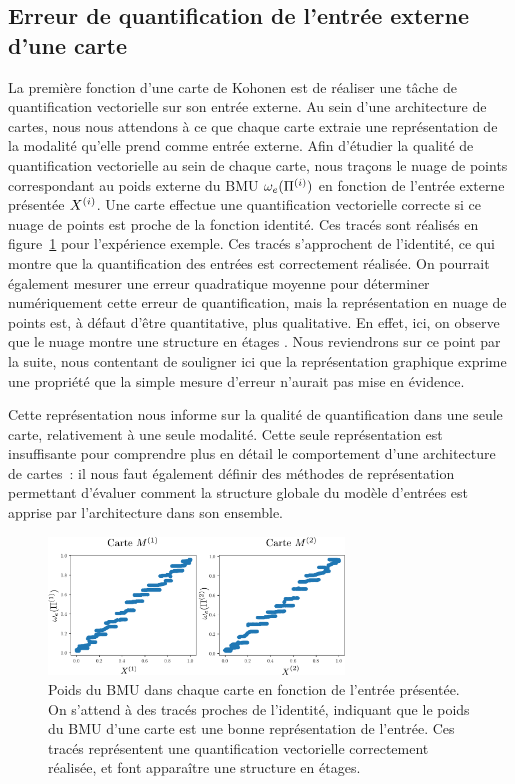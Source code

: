 \documentclass[../main]{subfiles}
\begin{document}
\subsection{Erreur de quantification de l'entrée externe d'une carte}

La première fonction d'une carte de Kohonen est de réaliser une tâche de quantification vectorielle sur son entrée externe. 
Au sein d'une architecture de cartes, nous nous attendons à ce que chaque carte extraie une représentation de la modalité qu'elle prend comme entrée externe.
Afin d'étudier la qualité de quantification vectorielle au sein de chaque carte, nous traçons le nuage de points correspondant au poids externe du BMU $\omega_e(\Pi^{({i})})$ en fonction de l'entrée externe présentée $X^{({i})}$. 
Une carte effectue une quantification vectorielle correcte si ce nuage de points est proche de la fonction identité.
Ces tracés sont réalisés en figure~\ref{fig:erreur} pour l'expérience exemple. Ces tracés s'approchent de l'identité, ce qui montre que la quantification des entrées est correctement réalisée.
On pourrait également mesurer une erreur quadratique moyenne pour déterminer numériquement cette erreur de quantification, mais la représentation en nuage de points est, à défaut d'être quantitative, plus qualitative. 
En effet, ici, on observe que le nuage montre une structure \og en étages \fg{}. Nous reviendrons sur ce point par la suite, nous contentant de souligner ici que la représentation graphique exprime une propriété que la simple mesure d'erreur n'aurait pas mise en évidence.

Cette représentation nous informe sur la qualité de quantification dans une seule carte, relativement à une seule modalité. Cette seule représentation est insuffisante pour comprendre plus en détail le comportement d'une architecture de cartes~: il nous faut également définir des méthodes de représentation permettant d'évaluer comment la structure globale du modèle d'entrées est apprise par l'architecture dans son ensemble.

\begin{figure}
    \centering
    \includegraphics[width=0.7\textwidth]{w_x.pdf}
    \caption{Poids du BMU dans chaque carte en fonction de l'entrée présentée. On s'attend à des tracés proches de l'identité, indiquant que le poids du BMU d'une carte est une bonne représentation de l'entrée. 
    Ces tracés représentent une quantification vectorielle correctement réalisée, et font apparaître une structure en étages.
     \label{fig:erreur}}
\end{figure}
\end{document}
